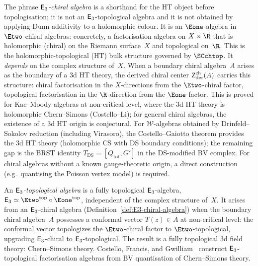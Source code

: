 \begin{definition}
\label{def:E3-chiral-algebra}
The phrase \emph{$\mathsf{E}_3$-chiral algebra} is a shorthand for the HT
object before topologisation; it is not an $\mathsf{E}_3$-topological
algebra and it is not obtained by applying Dunn additivity to a
holomorphic colour. It is an
$\Eone$-algebra in $\Etwo$-chiral algebras: concretely, a
factorisation algebra on $X \times \R$ that is holomorphic
(chiral) on the Riemann surface~$X$ and topological on~$\R$. This is the
holomorphic-topological (HT) bulk structure governed by
$\SCchtop$. It \emph{depends} on the complex structure of~$X$.
When a boundary chiral algebra~$A$ arises as the boundary of a
$3$d HT theory, the derived chiral center
$\operatorname{Z}_{\mathrm{der}}^{\mathrm{ch}}(A)$ carries this structure: chiral
factorisation in the $X$-directions from the $\Etwo$-chiral
factor, topological factorisation in the $\R$-direction from the
$\Eone$ factor. This is proved for Kac--Moody algebras at
non-critical level, where the $3$d HT theory is holomorphic
Chern--Simons (Costello--Li); for general chiral algebras, the existence of a $3$d HT
origin is conjectural. For $\mathcal{W}$-algebras obtained
by Drinfeld--Sokolov reduction (including Virasoro), the
Costello--Gaiotto theorem provides the $3$d HT theory
(holomorphic CS with DS boundary conditions); the remaining
gap is the BRST identity $T_{\mathrm{DS}} = [Q_{\mathrm{tot}}, G']$
in the DS-modified BV complex. For chiral algebras
without a known gauge-theoretic origin, a direct construction
(e.g.\ quantising the Poisson vertex model) is required.
\end{definition}

\begin{definition}
\label{def:E3-topological-algebra}
An \emph{$\mathsf{E}_3$-topological algebra} is a fully topological
$\mathsf{E}_3$-algebra, $\Ethree \simeq \Etwo^{\mathrm{top}} \circ
\Eone^{\mathrm{top}}$, independent of the complex structure
of~$X$. It arises from an $\mathsf{E}_3$-chiral algebra
(Definition~\ref{def:E3-chiral-algebra}) when the boundary
chiral algebra~$A$ possesses a conformal vector
$T(z) \in A$ at non-critical level: the conformal vector
topologizes the $\Etwo$-chiral factor to $\Etwo$-topological,
upgrading $\mathsf{E}_3$-chiral to $\mathsf{E}_3$-topological. The
result is a fully topological $3$d field theory: Chern--Simons
theory. Costello, Francis, and Gwilliam~\cite{CFG26} construct
$\mathsf{E}_3$-topological factorisation algebras from BV
quantisation of Chern--Simons theory.
\end{definition}

